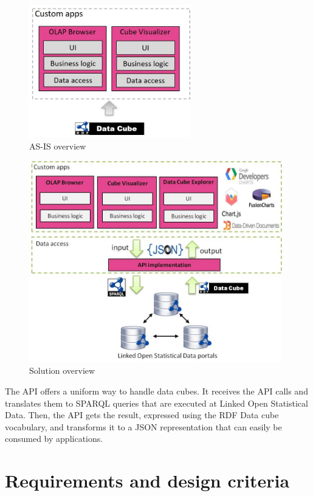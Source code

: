 \documentclass{llncs}
\begin{document}
\begin{figure}
\begin{center}
  \includegraphics[width=70mm]{images/overview1.jpg}
  \end{center}
\caption{AS-IS overview}
\label{fig:overview1}
\end{figure}


\begin{figure}[h!]
  \includegraphics[width=110mm]{images/overview.jpg}
\caption{Solution overview}
\label{fig:overview}
\end{figure}

The API offers a uniform way to handle data cubes. It receives the API calls and translates them to SPARQL queries that are executed at Linked Open Statistical Data. Then, the API gets the result, expressed using the RDF Data cube vocabulary, and transforms it to a JSON representation that can easily be consumed by applications.



\section{Requirements and design criteria}\label{sec:reqs}
\end{document}
